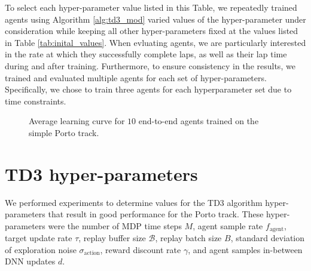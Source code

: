 

To select each hyper-parameter value listed in this Table, we repeatedly trained agents using Algorithm \ref{alg:td3_mod} 
varied values of the hyper-parameter under consideration while keeping all other hyper-parameters fixed at the values listed in Table \ref{tab:inital_values}. 
When evluating agents, we are particularly interested in the rate at which they successfully complete laps, as well as their lap time during and after training.
Furthermore, to ensure consistency in the results, we trained and evaluated multiple agents for each set of hyper-parameters. 
Specifically, we chose to train three agents for each hyperparameter set due to time constraints.



%     

\begin{figure}[htb!]
    \centering
    
    \caption[Learning curve for end-to-end agents]{Average learning curve for $10$ end-to-end agents trained on the simple Porto track.}
    \label{fig:MDP_steps_learning_curve}
\end{figure}



\section{TD3 hyper-parameters}\label{sec:algorithm_selection}


We performed experiments to determine values for the TD3 algorithm hyper-parameters that result in good performance for the Porto track.
These hyper-parameters were the number of MDP time steps $M$, agent sample rate $f_{\text{agent}}$, target update rate $\tau$, replay buffer size $\mathcal{B}$, replay batch size $B$, standard deviation of exploration noise $\sigma_{\text{action}}$, reward discount rate $\gamma$, and agent samples in-between DNN updates $d$.


